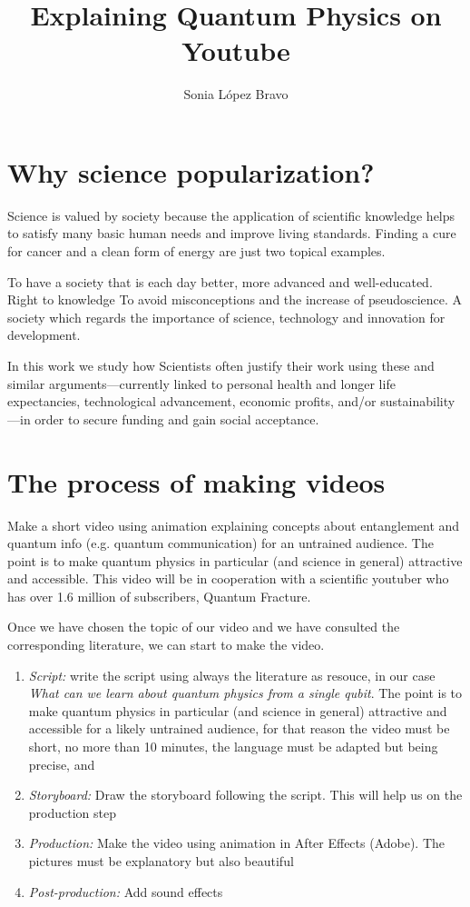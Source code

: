 \documentclass[final,a4paper,10pt]{article}
\author{Sonia López Bravo}
\title{\bf{Explaining Quantum Physics on Youtube}}
\date{}
\numberwithin{equation}{section}
\numberwithin{figure}{section}
\numberwithin{table}{section}
\begin{document}
\maketitle

\pagestyle{fancy}
\rhead{}
\lfoot{} %
\cfoot{}
\rfoot{\thepage} %
\renewcommand{\headrulewidth}{0pt} %
\renewcommand{\footrulewidth}{0.4pt} %
\renewcommand{\tablename}{Tabla}
\section{Why science popularization?}
Science is valued by society because the application of scientific knowledge helps to satisfy many basic human needs and improve living standards. Finding a cure for cancer and a clean form of energy are just two topical examples.


To have a society that is each day better, more advanced and well-educated. Right to knowledge 
To avoid misconceptions and the increase of pseudoscience.
A society which regards the importance of science, technology and innovation for development.

In this work we study how 
Scientists often justify their work using these and similar arguments—currently linked to personal health and longer life expectancies, technological advancement, economic profits, and/or sustainability—in order to secure funding and gain social acceptance.
\section{The process of making videos}
Make a short video using animation explaining concepts about entanglement and quantum info (e.g.
quantum communication) for an untrained audience. The point is to make quantum physics in
particular (and science in general) attractive and accessible. This video will be in cooperation with a
scientific youtuber who has over 1.6 million of subscribers, Quantum Fracture.

Once we have chosen the topic of our video and we have consulted the corresponding literature, we can start to make the video. 
\begin{enumerate}
\item \textit{Script:} write the script using always the literature as resouce, in our case \textit{What can we learn about quantum physics from a single qubit}. The point is to make quantum physics in particular (and science in general) attractive and accessible for a likely untrained audience, for that reason the video must be short, no more than 10 minutes, the language must be adapted but being precise, and
\item \textit{Storyboard:} Draw the storyboard following the script. This will help us on the production step
\item \textit{Production:} Make the video using animation in After Effects (Adobe). The pictures must be explanatory but also beautiful
\item \textit{Post-production:} Add sound effects
\end{enumerate}
\end{document}
